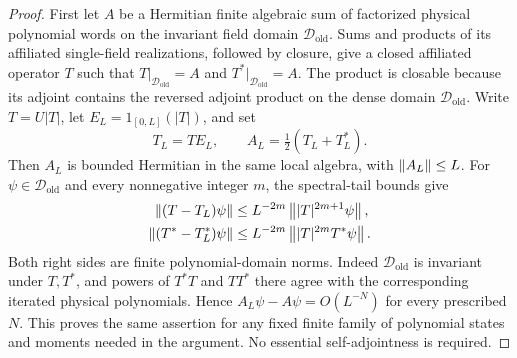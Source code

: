 \begin{proof}
First let $A$ be a Hermitian finite algebraic sum of factorized physical
polynomial words on the invariant field domain $\mathcal D_{\mathrm{old}}$.
Sums and products of its affiliated single-field realizations,
followed by closure, give a closed affiliated operator $T$ such that
$T|_{\mathcal D_{\mathrm{old}}}=A$ and
$T^*|_{\mathcal D_{\mathrm{old}}}=A$.  The product is
closable because its adjoint contains the reversed adjoint product
on the dense domain $\mathcal D_{\mathrm{old}}$.  Write $T=U|T|$, let
$E_L=1_{[0,L]}(|T|)$, and set
\[
 T_L=TE_L,\qquad A_L=\tfrac12(T_L+T_L^*).
\]
Then $A_L$ is bounded Hermitian in the same local algebra, with
$\left\lVert A_L\right\rVert\leq L$.  For $\psi\in\mathcal D_{\mathrm{old}}$ and every nonnegative integer $m$,
the spectral-tail bounds give
\begin{align}\label{N:polar-tails}
 \left\lVert(T-T_L)\psi\right\rVert
 &\leq L^{-2m}\left\lVert|T|^{2m+1}\psi\right\rVert,\notag\\
 \left\lVert(T^*-T_L^*)\psi\right\rVert
 &\leq L^{-2m}\left\lVert|T|^{2m}T^*\psi\right\rVert.
\end{align}
Both right sides are finite polynomial-domain norms.  Indeed
$\mathcal D_{\mathrm{old}}$ is invariant under $T,T^*$, and powers of $T^*T$ and
$TT^*$ there agree with the corresponding iterated physical
polynomials.  Hence $A_L\psi-A\psi=O(L^{-N})$ for every prescribed
$N$.  This proves the same assertion for any fixed finite family
of polynomial states and moments needed in the argument.  No
essential self-adjointness is required.


\end{proof}
